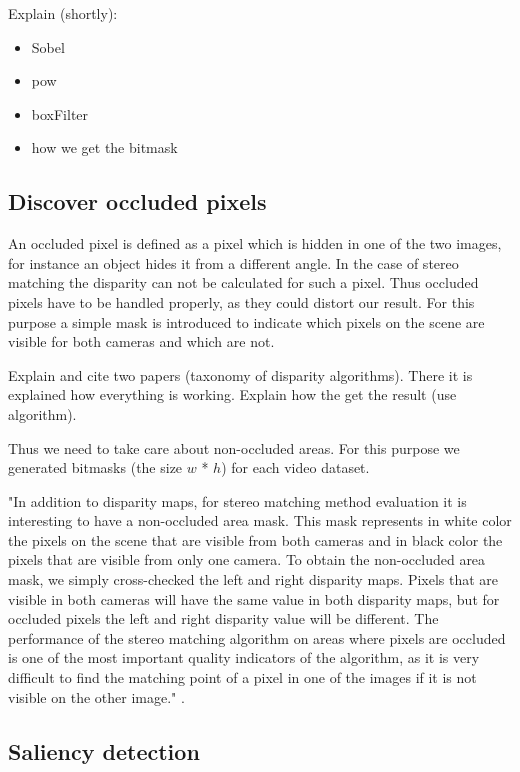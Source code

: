 Explain (shortly):

\begin{itemize}
  \item Sobel
  \item pow
  \item boxFilter
  \item how we get the bitmask
\end{itemize}

\subsection*{Discover occluded pixels}

An occluded pixel is defined as a pixel which is hidden in one of the two images, for instance an object hides it from a different angle.
In the case of stereo matching the disparity can not be calculated for such a pixel.
Thus occluded pixels have to be handled properly, as they could distort our result.
For this purpose a simple mask is introduced to indicate which pixels on the scene are visible for both cameras and which are not.

Explain and cite two papers (taxonomy of disparity algorithms).
There it is explained how everything is working.
Explain how the get the result (use algorithm).

Thus we need to take care about non-occluded areas. For this purpose we generated bitmasks (the size $w$ * $h$) for each video dataset.

"In addition to disparity maps, for stereo matching method evaluation it is interesting to have a non-occluded area mask. This mask represents in white color the pixels on the scene that are visible from both cameras and in black color the pixels that are visible from only one camera.
To obtain the non-occluded area mask, we simply cross-checked the left and right disparity maps. Pixels that are visible in both cameras will have the same value in both disparity maps, but for occluded pixels the left and right disparity value will be different.
The performance of the stereo matching algorithm on areas where pixels are occluded is one of the most important quality indicators of the algorithm, as it is very difficult to find the matching point of a pixel in one of the images if it is not visible on the other image." \citep{martull2012realistic}.

\subsection*{Saliency detection}

